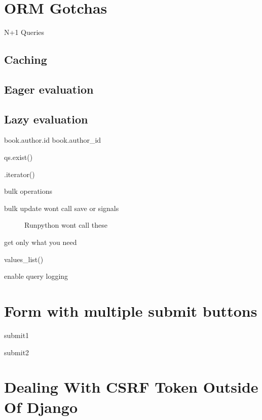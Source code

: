 \documentclass[letterpaper,11pt,english]{sphinxmanual}
\begin{document}
\chapter{ORM Gotchas}
\label{\detokenize{orm_optimizations:orm-gotchas}}\label{\detokenize{orm_optimizations::doc}}
N+1 Queries


\section{Caching}
\label{\detokenize{orm_optimizations:caching}}

\section{Eager evaluation}
\label{\detokenize{orm_optimizations:eager-evaluation}}

\section{Lazy evaluation}
\label{\detokenize{orm_optimizations:lazy-evaluation}}
book.author.id
book.author\_id

qs.exist()

.iterator()

bulk operations
\begin{description}
\item[{bulk update wont call save or signals}] \leavevmode
Runpython wont call these

\end{description}

get only what you need

values\_list()

enable query logging


\chapter{Form with multiple submit buttons}
\label{\detokenize{forms_multi_submit:form-with-multiple-submit-buttons}}\label{\detokenize{forms_multi_submit::doc}}
submit1

submit2


\chapter{Dealing With CSRF Token Outside Of Django}
\label{\detokenize{misc_csrf_token:dealing-with-csrf-token-outside-of-django}}\label{\detokenize{misc_csrf_token::doc}}
\end{document}
